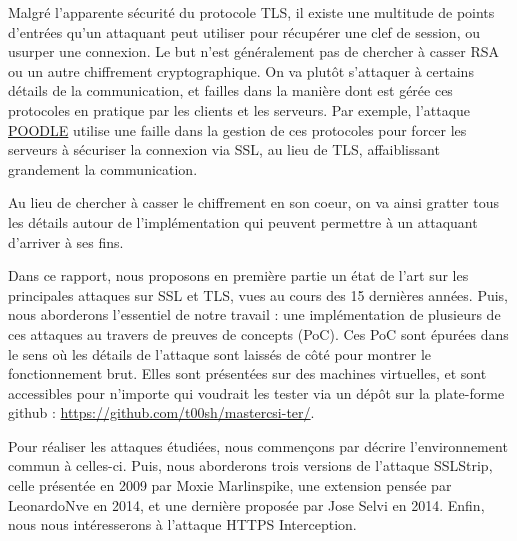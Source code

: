 Malgré l'apparente sécurité du protocole TLS, il existe une multitude de points d'entrées qu'un attaquant peut utiliser pour récupérer une clef de session, ou usurper une connexion. Le but n'est généralement pas de chercher à casser RSA ou un autre chiffrement cryptographique. On va plutôt s'attaquer à certains détails de la communication, et failles dans la manière dont est gérée ces protocoles en pratique par les clients et les serveurs. Par exemple, l'attaque \hyperref[sec:poodle]{POODLE} utilise une faille dans la gestion de ces protocoles pour forcer les serveurs à sécuriser la connexion via SSL, au lieu de TLS, affaiblissant grandement la communication.

Au lieu de chercher à casser le chiffrement en son coeur, on va ainsi gratter tous les détails autour de l'implémentation qui peuvent permettre à un attaquant d'arriver à ses fins.

Dans ce rapport, nous proposons en première partie un état de l'art sur les principales attaques sur SSL et TLS, vues au cours des 15 dernières années. Puis, nous aborderons l'essentiel de notre travail : une implémentation de plusieurs de ces attaques au travers de preuves de concepts (PoC). Ces PoC sont épurées dans le sens où les détails de l'attaque sont laissés de côté pour montrer le fonctionnement brut. Elles sont présentées sur des machines virtuelles, et sont accessibles pour n'importe qui voudrait les tester via un dépôt sur la plate-forme github : \url{https://github.com/t00sh/mastercsi-ter/}.


Pour réaliser les attaques étudiées, nous commençons par décrire l'environnement commun à celles-ci. Puis, nous aborderons trois versions de l'attaque SSLStrip, celle présentée en 2009 par Moxie Marlinspike, une extension pensée par LeonardoNve en 2014, et une dernière proposée par Jose Selvi en 2014. Enfin, nous nous intéresserons à l'attaque HTTPS Interception.
